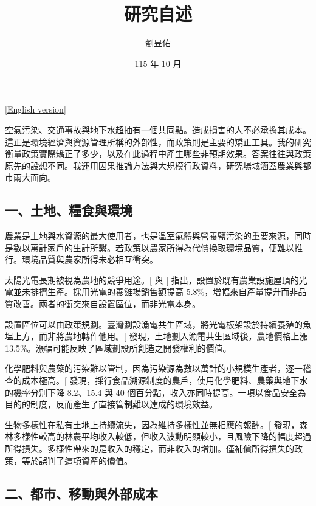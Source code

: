 \documentclass[
  11pt,
]{article}
\title{\textbf{研究自述}}
\author{劉昱佑}
\date{115 年 10 月}
\begin{document}
\maketitle

{\raggedleft\small[\href{https://yyliou.github.io/yyliou/rs/rs.pdf}{English version}]\par}

空氣污染、交通事故與地下水超抽有一個共同點。造成損害的人不必承擔其成本。這正是環境經濟與資源管理所稱的外部性，而政策則是主要的矯正工具。我的研究衡量政策實際矯正了多少，以及在此過程中產生哪些非預期效果。答案往往與政策原先的設想不同。我運用因果推論方法與大規模行政資料，研究場域涵蓋農業與都市兩大面向。

\subsection{一、土地、糧食與環境}\label{ux4e00ux571fux5730ux7ce7ux98dfux8207ux74b0ux5883}

農業是土地與水資源的最大使用者，也是溫室氣體與營養鹽污染的重要來源，同時是數以萬計家戶的生計所繫。若政策以農家所得為代價換取環境品質，便難以推行。環境品質與農家所得未必相互衝突。

太陽光電長期被視為農地的競爭用途。{[}\citeproc{ref-liou2025rooftop}{1}{]}
與 {[}\citeproc{ref-lee2025solar}{2}{]}
指出，設置於既有農業設施屋頂的光電並未排擠生產。採用光電的養雞場銷售額提高
5.8\%，增幅來自產量提升而非品質改善。兩者的衝突來自設置區位，而非光電本身。

設置區位可以由政策規劃。臺灣劃設漁電共生區域，將光電板架設於持續養殖的魚塭上方，而非將農地轉作他用。{[}\citeproc{ref-chang2026aquavoltaics}{3}{]}
發現，土地劃入漁電共生區域後，農地價格上漲
13.5\%。漲幅可能反映了區域劃設所創造之開發權利的價值。

化學肥料與農藥的污染難以管制，因為污染源為數以萬計的小規模生產者，逐一稽查的成本極高。{[}\citeproc{ref-chang2026food}{4}{]}
發現，採行食品溯源制度的農戶，使用化學肥料、農藥與地下水的機率分別下降
8.2、15.4 與 40
個百分點，收入亦同時提高。一項以食品安全為目的的制度，反而產生了直接管制難以達成的環境效益。

生物多樣性在私有土地上持續流失，因為維持多樣性並無相應的報酬。{[}\citeproc{ref-lee2025forest}{5}{]}
發現，森林多樣性較高的林農平均收入較低，但收入波動明顯較小，且風險下降的幅度超過所得損失。多樣性帶來的是收入的穩定，而非收入的增加。僅補償所得損失的政策，等於誤判了這項資產的價值。

\subsection{二、都市、移動與外部成本}\label{ux4e8cux90fdux5e02ux79fbux52d5ux8207ux5916ux90e8ux6210ux672c}
\end{document}
